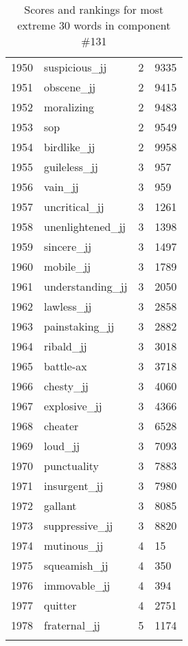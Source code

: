 \begin{longtable}[!htbp]{| rlr@{.}l |}
    1950 & suspicious\_jj & 2 & 9335 \\
    1951 & obscene\_jj & 2 & 9415 \\
    1952 & moralizing & 2 & 9483 \\
    1953 & sop & 2 & 9549 \\
    1954 & birdlike\_jj & 2 & 9958 \\
    1955 & guileless\_jj & 3 & 957 \\
    1956 & vain\_jj & 3 & 959 \\
    1957 & uncritical\_jj & 3 & 1261 \\
    1958 & unenlightened\_jj & 3 & 1398 \\
    1959 & sincere\_jj & 3 & 1497 \\
    1960 & mobile\_jj & 3 & 1789 \\
    1961 & understanding\_jj & 3 & 2050 \\
    1962 & lawless\_jj & 3 & 2858 \\
    1963 & painstaking\_jj & 3 & 2882 \\
    1964 & ribald\_jj & 3 & 3018 \\
    1965 & battle-ax & 3 & 3718 \\
    1966 & chesty\_jj & 3 & 4060 \\
    1967 & explosive\_jj & 3 & 4366 \\
    1968 & cheater & 3 & 6528 \\
    1969 & loud\_jj & 3 & 7093 \\
    1970 & punctuality & 3 & 7883 \\
    1971 & insurgent\_jj & 3 & 7980 \\
    1972 & gallant & 3 & 8085 \\
    1973 & suppressive\_jj & 3 & 8820 \\
    1974 & mutinous\_jj & 4 & 15 \\
    1975 & squeamish\_jj & 4 & 350 \\
    1976 & immovable\_jj & 4 & 394 \\
    1977 & quitter & 4 & 2751 \\
    1978 & fraternal\_jj & 5 & 1174 \\
    \hline
    \caption{Scores and rankings for most extreme 30 words in component \#131} \\
\end{longtable}
